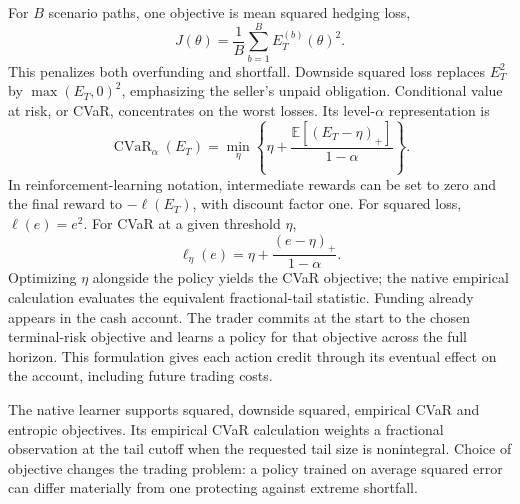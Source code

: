 \documentclass[8pt]{strategynet-journal}
\newcommand{\E}{\mathbb{E}}
\begin{document}
\begin{SNcolumns}
For $B$ scenario paths, one objective is mean squared hedging loss,
\begin{equation}
 J(\theta)=\frac1B\sum_{b=1}^B E_T^{(b)}(\theta)^2.
\end{equation}
This penalizes both overfunding and shortfall. Downside squared loss replaces
$E_T^2$ by $\max(E_T,0)^2$, emphasizing the seller's unpaid obligation.
Conditional value at risk, or CVaR, concentrates on the worst losses. Its
level-$\alpha$ representation is
\begin{equation}
 \operatorname{CVaR}_\alpha(E_T)=\min_\eta
 \left\{\eta+\frac{\E[(E_T-\eta)_+]}{1-\alpha}\right\}.
\end{equation}
In reinforcement-learning notation, intermediate rewards can be set to zero
and the final reward to $-\ell(E_T)$, with discount factor one. For squared
loss, $\ell(e)=e^2$. For CVaR at a given threshold $\eta$,
\begin{equation}
 \ell_\eta(e)=\eta+\frac{(e-\eta)_+}{1-\alpha}.
\end{equation}
Optimizing $\eta$ alongside the policy yields the CVaR objective; the native
empirical calculation evaluates the equivalent fractional-tail statistic.
Funding already appears in the cash account. The trader commits at the start
to the chosen terminal-risk objective and learns a policy for that objective
across the full horizon. This formulation gives each action credit through
its eventual effect on the account, including future trading costs.

\begin{center}
\end{center}

The native learner supports squared, downside squared, empirical CVaR and
entropic objectives. Its empirical CVaR calculation weights a fractional
observation at the tail cutoff when the requested tail size is nonintegral.
Choice of objective changes the trading problem: a policy trained on average
squared error can differ materially from one protecting against extreme shortfall.


\end{SNcolumns}
\end{document}
